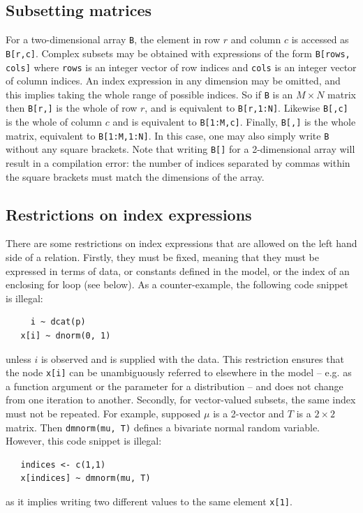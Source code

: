\documentclass[11pt, a4paper, titlepage]{report}
\begin{document}
\subsection{Subsetting matrices}

For a two-dimensional array \verb+B+, the element in row $r$ and
column $c$ is accessed as \verb+B[r,c]+. Complex subsets may be
obtained with expressions of the form \verb+B[rows, cols]+ where
\verb+rows+ is an integer vector of row indices and \verb+cols+ is an
integer vector of column indices.  An index expression in any
dimension may be omitted, and this implies taking the whole range of
possible indices. So if \verb+B+ is an $M \times N$ matrix then
\verb+B[r,]+ is the whole of row $r$, and is equivalent to
\verb+B[r,1:N]+. Likewise \verb+B[,c]+ is the whole of column $c$ and
is equivalent to \verb+B[1:M,c]+. Finally, \verb+B[,]+ is the whole
matrix, equivalent to \verb+B[1:M,1:N]+. In this case, one may also
simply write \verb+B+ without any square brackets. Note that writing
\verb+B[]+ for a 2-dimensional array will result in a compilation
error: the number of indices separated by commas within the square
brackets must match the dimensions of the array.

\subsection{Restrictions on index expressions}

There are some restrictions on index expressions that are allowed on
the left hand side of a relation. Firstly, they must be fixed, meaning
that they must be expressed in terms of data, or constants defined in
the model, or the index of an enclosing for loop (see below).  As
a counter-example, the following code snippet is illegal:
\begin{verbatim}
     i ~ dcat(p)
   x[i] ~ dnorm(0, 1)

\end{verbatim}
unless $i$ is observed and is supplied with the data. This restriction
ensures that the node \verb+x[i]+ can be unambiguously referred to
elsewhere in the model -- e.g. as a function argument or the parameter
for a distribution -- and does not change from one iteration to
another. Secondly, for vector-valued subsets, the same index must not
be repeated. For example, supposed $\mu$ is a 2-vector and $T$ is a
$2 \times 2$ matrix. Then \verb+dmnorm(mu, T)+ defines a bivariate
normal random variable.  However, this code snippet is illegal:
\begin{verbatim}
   indices <- c(1,1)
   x[indices] ~ dmnorm(mu, T)
\end{verbatim}
as it implies writing two different values to the same element \verb+x[1]+.
\end{document}
